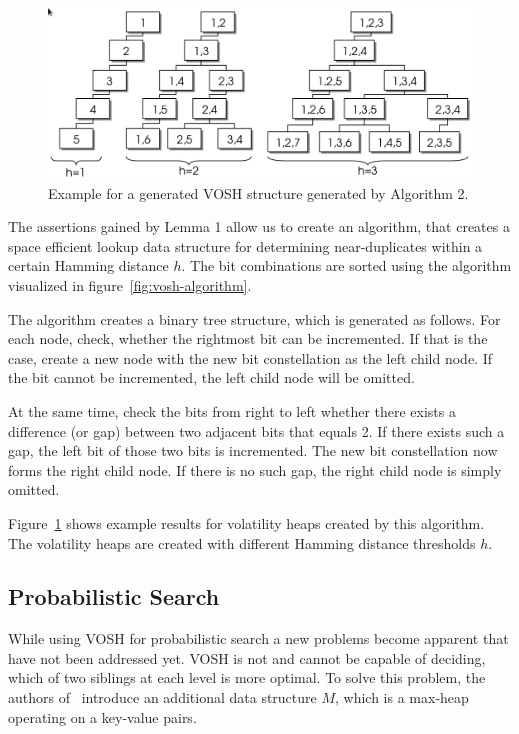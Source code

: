 \documentclass[12pt,a4paper,DIV=calc]{scrartcl}
\begin{document}
\begin{figure}[H]
    \includegraphics[scale=0.4]{./gfx/vosh_structure.png}
    \centering
    \caption{Example for a generated VOSH structure generated by Algorithm 2.}\label{fig:vosh-structure}
\end{figure}


The assertions gained by Lemma 1 allow us to create an algorithm, that creates a space efficient lookup data structure for determining near-duplicates within a certain Hamming distance $h$.
The bit combinations are sorted using the algorithm visualized in figure~\ref{fig:vosh-algorithm}.

The algorithm creates a binary tree structure, which is generated as follows.
For each node, check, whether the rightmost bit can be incremented.
If that is the case, create a new node with the new bit constellation as the left child node.
If the bit cannot be incremented, the left child node will be omitted.

At the same time, check the bits from right to left whether there exists a difference (or gap) between two adjacent bits that equals 2.
If there exists such a gap, the left bit of those two bits is incremented.
The new bit constellation now forms the right child node.
If there is no such gap, the right child node is simply omitted.

Figure~\ref{fig:vosh-structure} shows example results for volatility heaps created by this algorithm.
The volatility heaps are created with different Hamming distance thresholds $h$.

\subsection{Probabilistic Search}

While using VOSH for probabilistic search a new problems become apparent that have not been addressed yet.
VOSH is not and cannot be capable of deciding, which of two siblings at each level is more optimal.
To solve this problem, the authors of~\cite{inproc:main} introduce an additional data structure $M$, which is a max-heap operating on a key-value pairs.
\end{document}
